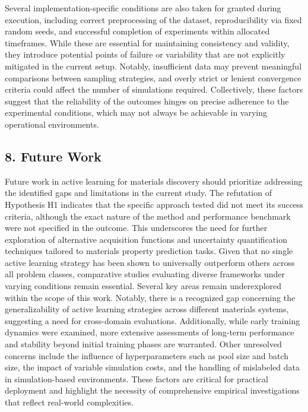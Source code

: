 Several implementation-specific conditions are also taken for granted during execution, including correct preprocessing of the dataset, reproducibility via fixed random seeds, and successful completion of experiments within allocated timeframes. While these are essential for maintaining consistency and validity, they introduce potential points of failure or variability that are not explicitly mitigated in the current setup. Notably, insufficient data may prevent meaningful comparisons between sampling strategies, and overly strict or lenient convergence criteria could affect the number of simulations required. Collectively, these factors suggest that the reliability of the outcomes hinges on precise adherence to the experimental conditions, which may not always be achievable in varying operational environments.

\subsection*{8. Future Work}

Future work in active learning for materials discovery should prioritize addressing the identified gaps and limitations in the current study. The refutation of Hypothesis H1 indicates that the specific approach tested did not meet its success criteria, although the exact nature of the method and performance benchmark were not specified in the outcome. This underscores the need for further exploration of alternative acquisition functions and uncertainty quantification techniques tailored to materials property prediction tasks. Given that no single active learning strategy has been shown to universally outperform others across all problem classes, comparative studies evaluating diverse frameworks under varying conditions remain essential. Several key areas remain underexplored within the scope of this work. Notably, there is a recognized gap concerning the generalizability of active learning strategies across different materials systems, suggesting a need for cross-domain evaluations. Additionally, while early training dynamics were examined, more extensive assessments of long-term performance and stability beyond initial training phases are warranted. Other unresolved concerns include the influence of hyperparameters such as pool size and batch size, the impact of variable simulation costs, and the handling of mislabeled data in simulation-based environments. These factors are critical for practical deployment and highlight the necessity of comprehensive empirical investigations that reflect real-world complexities.

